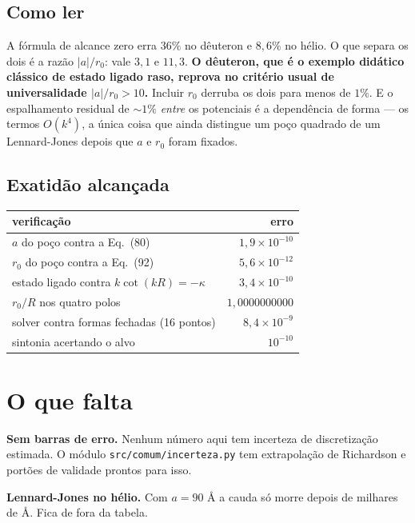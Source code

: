 \documentclass[11pt,a4paper]{article}
\begin{document}
\subsection*{Como ler}

A fórmula de alcance zero erra $36\%$ no dêuteron e $8{,}6\%$ no hélio. O que
separa os dois é a razão $|a|/r_0$: vale $3{,}1$ e $11{,}3$. \textbf{O dêuteron,
que é o exemplo didático clássico de estado ligado raso, reprova no critério
usual de universalidade $|a|/r_0 > 10$.} Incluir $r_0$ derruba os dois para menos
de $1\%$. E o espalhamento residual de $\sim1\%$ \emph{entre} os potenciais é a
dependência de forma --- os termos $O(k^4)$, a única coisa que ainda distingue um
poço quadrado de um Lennard-Jones depois que $a$ e $r_0$ foram fixados.

\subsection{Exatidão alcançada}

\begin{center}
\begin{tabular}{lr}
\toprule
verificação & erro \\
\midrule
$a$ do poço contra a Eq.~(80) & $1{,}9\times10^{-10}$ \\
$r_0$ do poço contra a Eq.~(92) & $5{,}6\times10^{-12}$ \\
estado ligado contra $k\cot(kR)=-\kappa$ & $3{,}4\times10^{-10}$ \\
$r_0/R$ nos quatro polos & $1{,}0000000000$ \\
solver contra formas fechadas (16 pontos) & $8{,}4\times10^{-9}$ \\
sintonia acertando o alvo & $10^{-10}$ \\
\bottomrule
\end{tabular}
\end{center}

\section{O que falta}

\textbf{Sem barras de erro.} Nenhum número aqui tem incerteza de discretização
estimada. O módulo \texttt{src/comum/incerteza.py} tem extrapolação de Richardson
e portões de validade prontos para isso.

\textbf{Lennard-Jones no hélio.} Com $a = 90$ \AA{} a cauda só morre depois de
milhares de \AA. Fica de fora da tabela.
\end{document}
